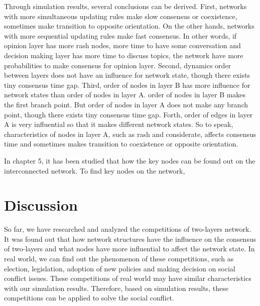 Through simulation results, several conclusions can be derived. First, networks with more simultaneous updating rules make slow consensus or coexistence, sometimes make transition to opposite orientation. On the other hands, networks with more sequential updating rules make fast consensus. In other words, if opinion layer has more rash nodes, more time to have some conversation and decision making layer has more time to  discuss topics, the network have more probabilities to make consensus for opinion layer. Second, dynamics order between layers does not have an influence for network state, though there exists tiny consensus time gap. Third, order of nodes in layer B has more influence for network states than order of nodes in layer A. order of nodes in layer B makes the first branch point. But order of nodes in layer A does not make any branch point, though there exists tiny consensus time gap. Forth, order of edges in layer A is very influential so that it makes different network states. So to speak, characteristics of nodes in layer A, such as rash and considerate, affects consensus time and sometimes makes transition to coexistence or opposite orientation. 



In chapter 5, it has been studied that how the key nodes can be found out on the interconnected network. To find key nodes on the network, 

\section{Discussion} 

So far, we have researched and analyzed the competitions of two-layers network. It was found out that how network structures have the influence on the consensus of two-layers and what nodes have more influential to affect the network state. In real world, we can find out the phenomenon of these competitions, such as election, legislation, adoption of new policies and making decision on social conflict issues. These competitions of real world may have similar characteristics with our simulation results. Therefore, based on simulation results, these competitions can be applied to solve the social conflict.  